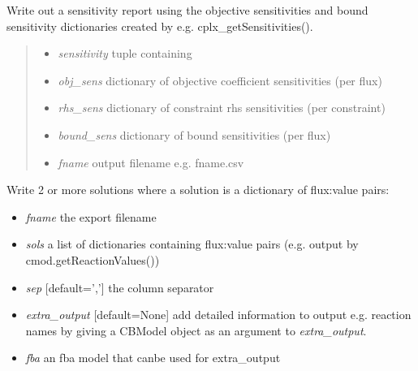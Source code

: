 \documentclass[a4paper,11pt,english]{sphinxmanual}
\begin{document}
\begin{fulllineitems}
\label{modules_doc:cbmpy.CBWrite.writeSensitivitiesToCSV}
Write out a sensitivity report using the objective sensitivities and
bound sensitivity dictionaries created by e.g. cplx\_getSensitivities().
\begin{quote}
\begin{itemize}
\item {} 
\emph{sensitivity} tuple containing

\end{itemize}
\begin{itemize}
\item {} 
\emph{obj\_sens} dictionary of objective coefficient sensitivities (per flux)

\item {} 
\emph{rhs\_sens} dictionary of constraint rhs sensitivities (per constraint)

\item {} 
\emph{bound\_sens} dictionary of bound sensitivities (per flux)

\end{itemize}
\begin{itemize}
\item {} 
\emph{fname} output filename e.g. fname.csv

\end{itemize}
\end{quote}

\end{fulllineitems}


\begin{fulllineitems}
\label{modules_doc:cbmpy.CBWrite.writeSolutions}
Write 2 or more solutions where a solution is a dictionary of flux:value pairs:
\begin{itemize}
\item {} 
\emph{fname} the export filename

\item {} 
\emph{sols} a list of dictionaries containing flux:value pairs (e.g. output by cmod.getReactionValues())

\item {} 
\emph{sep} {[}default=','{]} the column separator

\item {} 
\emph{extra\_output} {[}default=None{]} add detailed information to output e.g. reaction names by giving a CBModel object as an argument to \emph{extra\_output}.

\item {} 
\emph{fba} an fba model that canbe used for extra\_output

\end{itemize}

\end{fulllineitems}
\end{document}
